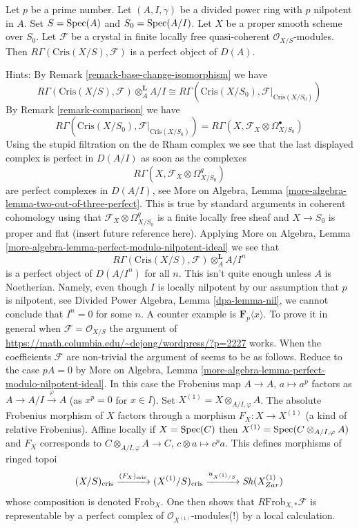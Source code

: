 \begin{remark}[Perfectness]
\label{remark-perfect}
Let $p$ be a prime number. Let $(A, I, \gamma)$ be a divided power
ring with $p$ nilpotent in $A$. Set $S = \mathop{\mathrm{Spec}}(A)$ and
$S_0 = \mathop{\mathrm{Spec}}(A/I)$. Let $X$ be a proper smooth scheme over $S_0$.
Let $\mathcal{F}$ be a crystal in finite locally free
quasi-coherent $\mathcal{O}_{X/S}$-modules.
Then $R\Gamma(\text{Cris}(X/S), \mathcal{F})$ is a
perfect object of $D(A)$.

\medskip\noindent
Hints: By Remark \ref{remark-base-change-isomorphism} we have
$$
R\Gamma(\text{Cris}(X/S), \mathcal{F}) \otimes_A^\mathbf{L} A/I
\cong
R\Gamma(\text{Cris}(X/S_0), \mathcal{F}|_{\text{Cris}(X/S_0)})
$$
By Remark \ref{remark-comparison} we have
$$
R\Gamma(\text{Cris}(X/S_0), \mathcal{F}|_{\text{Cris}(X/S_0)}) =
R\Gamma(X, \mathcal{F}_X \otimes \Omega^\bullet_{X/S_0})
$$
Using the stupid filtration on the de Rham complex we see that
the last displayed complex is perfect in $D(A/I)$ as soon as the complexes
$$
R\Gamma(X, \mathcal{F}_X \otimes \Omega^q_{X/S_0})
$$
are perfect complexes in $D(A/I)$, see
More on Algebra, Lemma \ref{more-algebra-lemma-two-out-of-three-perfect}.
This is true by standard arguments
in coherent cohomology using that $\mathcal{F}_X \otimes \Omega^q_{X/S_0}$
is a finite locally free sheaf and $X \to S_0$ is proper and flat
(insert future reference here). Applying
More on Algebra, Lemma \ref{more-algebra-lemma-perfect-modulo-nilpotent-ideal}
we see that
$$
R\Gamma(\text{Cris}(X/S), \mathcal{F}) \otimes_A^\mathbf{L} A/I^n
$$
is a perfect object of $D(A/I^n)$ for all $n$. This isn't quite enough
unless $A$ is Noetherian. Namely, even though $I$ is locally nilpotent
by our assumption that $p$ is nilpotent, see
Divided Power Algebra, Lemma \ref{dpa-lemma-nil},
we cannot conclude that $I^n = 0$ for some $n$. A counter example
is $\mathbf{F}_p\langle x \rangle$. To prove it in general when
$\mathcal{F} = \mathcal{O}_{X/S}$ the argument of
\url{https://math.columbia.edu/~dejong/wordpress/?p=2227}
works. When the coefficients $\mathcal{F}$ are non-trivial the
argument of \cite{Faltings-very} seems to be as follows. Reduce to the
case $pA = 0$ by More on Algebra, Lemma
\ref{more-algebra-lemma-perfect-modulo-nilpotent-ideal}.
In this case the Frobenius map $A \to A$, $a \mapsto a^p$ factors
as $A \to A/I \xrightarrow{\varphi} A$ (as $x^p = 0$ for $x \in I$). Set
$X^{(1)} = X \otimes_{A/I, \varphi} A$. The absolute Frobenius morphism
of $X$ factors through a morphism $F_X : X \to X^{(1)}$ (a kind of
relative Frobenius). Affine locally if $X = \mathop{\mathrm{Spec}}(C)$ then
$X^{(1)} = \mathop{\mathrm{Spec}}( C \otimes_{A/I, \varphi} A)$
and $F_X$ corresponds to $C \otimes_{A/I, \varphi} A \to C$,
$c \otimes a \mapsto c^pa$. This defines morphisms of ringed topoi
$$
(X/S)_{\text{cris}}
\xrightarrow{(F_X)_{\text{cris}}}
(X^{(1)}/S)_{\text{cris}}
\xrightarrow{u_{X^{(1)}/S}}
\mathop{\mathit{Sh}}\nolimits(X^{(1)}_{Zar})
$$
whose composition is denoted $\text{Frob}_X$. One then shows that
$R\text{Frob}_{X, *}\mathcal{F}$ is representable by a
perfect complex of $\mathcal{O}_{X^{(1)}}$-modules(!)
by a local calculation.
\end{remark}

